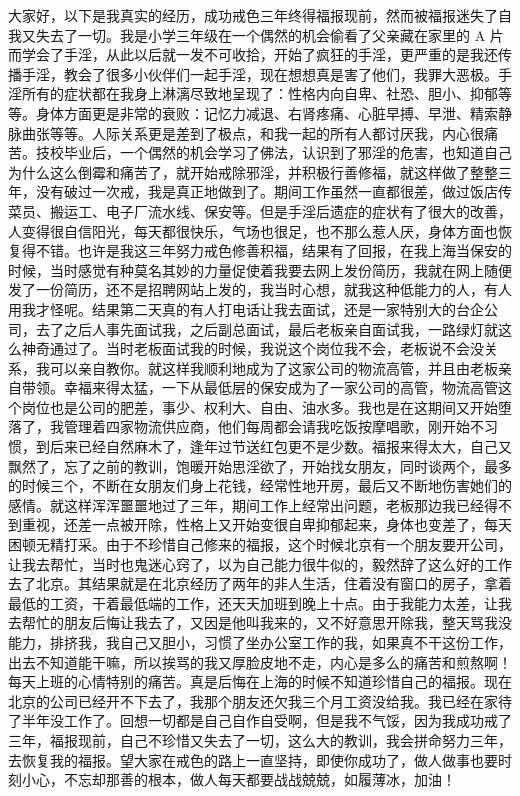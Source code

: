 \begin{case}
    大家好，以下是我真实的经历，成功戒色三年终得福报现前，然而被福报迷失了自我又失去了一切。我是小学三年级在一个偶然的机会偷看了父亲藏在家里的 A 片而学会了手淫，从此以后就一发不可收拾，开始了疯狂的手淫，更严重的是我还传播手淫，教会了很多小伙伴们一起手淫，现在想想真是害了他们，我罪大恶极。手淫所有的症状都在我身上淋漓尽致地呈现了：性格内向自卑、社恐、胆小、抑郁等等。身体方面更是非常的衰败：记忆力减退、右肾疼痛、心脏早搏、早泄、精索静脉曲张等等。人际关系更是差到了极点，和我一起的所有人都讨厌我，内心很痛苦。技校毕业后，一个偶然的机会学习了佛法，认识到了邪淫的危害，也知道自己为什么这么倒霉和痛苦了，就开始戒除邪淫，并积极行善修福，就这样做了整整三年，没有破过一次戒，我是真正地做到了。期间工作虽然一直都很差，做过饭店传菜员、搬运工、电子厂流水线、保安等。但是手淫后遗症的症状有了很大的改善，人变得很自信阳光，每天都很快乐，气场也很足，也不那么惹人厌，身体方面也恢复得不错。也许是我这三年努力戒色修善积福，结果有了回报，在我上海当保安的时候，当时感觉有种莫名其妙的力量促使着我要去网上发份简历，我就在网上随便发了一份简历，还不是招聘网站上发的，我当时心想，就我这种低能力的人，有人用我才怪呢。结果第二天真的有人打电话让我去面试，还是一家特别大的台企公司，去了之后人事先面试我，之后副总面试，最后老板亲自面试我，一路绿灯就这么神奇通过了。当时老板面试我的时候，我说这个岗位我不会，老板说不会没关系，我可以亲自教你。就这样我顺利地成为了这家公司的物流高管，并且由老板亲自带领。幸福来得太猛，一下从最低层的保安成为了一家公司的高管，物流高管这个岗位也是公司的肥差，事少、权利大、自由、油水多。我也是在这期间又开始堕落了，我管理着四家物流供应商，他们每周都会请我吃饭按摩唱歌，刚开始不习惯，到后来已经自然麻木了，逢年过节送红包更不是少数。福报来得太大，自己又飘然了，忘了之前的教训，饱暖开始思淫欲了，开始找女朋友，同时谈两个，最多的时候三个，不断在女朋友们身上花钱，经常性地开房，最后又不断地伤害她们的感情。就这样浑浑噩噩地过了三年，期间工作上经常出问题，老板那边我已经得不到重视，还差一点被开除，性格上又开始变很自卑抑郁起来，身体也变差了，每天困顿无精打采。由于不珍惜自己修来的福报，这个时候北京有一个朋友要开公司，让我去帮忙，当时也鬼迷心窍了，以为自己能力很牛似的，毅然辞了这么好的工作去了北京。其结果就是在北京经历了两年的非人生活，住着没有窗口的房子，拿着最低的工资，干着最低端的工作，还天天加班到晚上十点。由于我能力太差，让我去帮忙的朋友后悔让我去了，又因是他叫我来的，又不好意思开除我，整天骂我没能力，排挤我，我自己又胆小，习惯了坐办公室工作的我，如果真不干这份工作，出去不知道能干嘛，所以挨骂的我又厚脸皮地不走，内心是多么的痛苦和煎熬啊！每天上班的心情特别的痛苦。真是后悔在上海的时候不知道珍惜自己的福报。现在北京的公司已经开不下去了，我那个朋友还欠我三个月工资没给我。我已经在家待了半年没工作了。回想一切都是自己自作自受啊，但是我不气馁，因为我成功戒了三年，福报现前，自己不珍惜又失去了一切，这么大的教训，我会拼命努力三年，去恢复我的福报。望大家在戒色的路上一直坚持，即使你成功了，做人做事也要时刻小心，不忘却那善的根本，做人每天都要战战兢兢，如履薄冰，加油！

\end{case}
